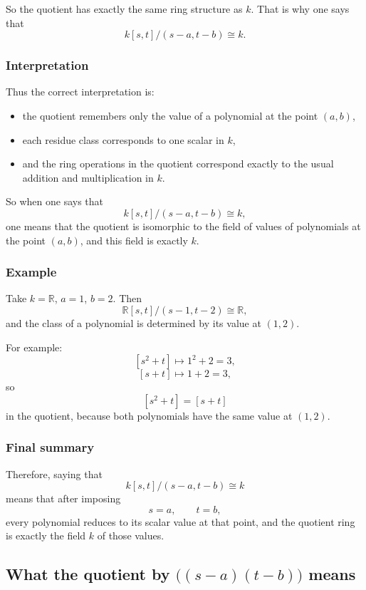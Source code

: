 \documentclass[12pt,a4paper]{article}
\theoremstyle{notespace}
\theoremstyle{definition}
\begin{document}
So the quotient has exactly the same ring structure as \(k\).  
That is why one says that
\[
k[s,t]/(s-a,t-b)\cong k.
\]

\subsubsection{Interpretation}

Thus the correct interpretation is:

\begin{itemize}
	\item the quotient remembers only the value of a polynomial at the point \((a,b)\),
	\item each residue class corresponds to one scalar in \(k\),
	\item and the ring operations in the quotient correspond exactly to the usual addition and multiplication in \(k\).
\end{itemize}

So when one says that
\[
k[s,t]/(s-a,t-b)\cong k,
\]
one means that the quotient is isomorphic to the field of values of polynomials at the point \((a,b)\), and this field is exactly \(k\).

\subsubsection{Example}

Take \(k=\mathbb{R}\), \(a=1\), \(b=2\). Then
\[
\mathbb{R}[s,t]/(s-1,t-2)\cong \mathbb{R},
\]
and the class of a polynomial is determined by its value at \((1,2)\).

For example:
\[
[s^2+t]\mapsto 1^2+2=3,
\]
\[
[s+t]\mapsto 1+2=3,
\]
so
\[
[s^2+t]=[s+t]
\]
in the quotient, because both polynomials have the same value at \((1,2)\).

\subsubsection{Final summary}

Therefore, saying that
\[
k[s,t]/(s-a,t-b)\cong k
\]
means that after imposing
\[
s=a,\qquad t=b,
\]
every polynomial reduces to its scalar value at that point, and the quotient ring is exactly the field \(k\) of those values.

\subsection{What the quotient by \(\bigl((s-a)(t-b)\bigr)\) means}
\end{document}
